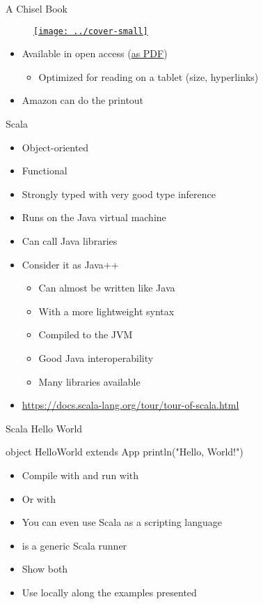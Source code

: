 \begin{frame}[fragile]{A Chisel Book}
\begin{figure}
    \centering
    \href{https://github.com/schoeberl/chisel-book}{\texttt{[image: ../cover-small]}}
\end{figure}

\begin{itemize}
\item Available in open access (\href{https://www.imm.dtu.dk/~masca/chisel-book.pdf}{as PDF})
\begin{itemize}
\item Optimized for reading on a tablet (size, hyperlinks)
\end{itemize}
\item Amazon can do the printout
\end{itemize}
\end{frame}

\begin{frame}[fragile]{Scala}
\begin{itemize}
\item Object-oriented
\item Functional
\item Strongly typed with very good type inference
\item Runs on the Java virtual machine
\item Can call Java libraries
\item Consider it as Java++
\begin{itemize}
\item Can almost be written like Java
\item With a more lightweight syntax
\item Compiled to the JVM
\item Good Java interoperability
\item Many libraries available
\end{itemize}
\item \url{https://docs.scala-lang.org/tour/tour-of-scala.html}
\end{itemize}
\end{frame}

\begin{frame}[fragile]{Scala Hello World}
\begin{chisel}
object HelloWorld extends App {
  println("Hello, World!")
}
\end{chisel}
\begin{itemize}
\item Compile with  and run with 
\item Or with 
\item You can even use Scala as a scripting language
\item {} is a generic Scala runner
\item Show both
\item Use  locally along the examples presented
\end{itemize}
\end{frame}

